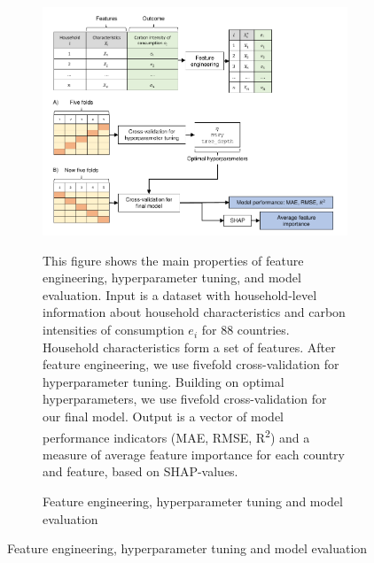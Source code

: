 \begin{figure}[ht!]\ContinuedFloat
   \begin{subfigure}[b]{\textwidth}
  \centering
  \includegraphics{1_Figures/Figures_Appendix/Graphical representation of data work_2.pdf}
  \caption{Feature engineering, hyperparameter tuning and model evaluation} \label{fig:data_visualisation_2}
  \begin{subcaption2}
    This figure shows the main properties of feature engineering, hyperparameter tuning, and model evaluation. Input is a dataset with household-level information about household characteristics and carbon intensities of consumption $e_{i}$ for 88 countries. Household characteristics form a set of features. After feature engineering, we use fivefold cross-validation for hyperparameter tuning. Building on optimal hyperparameters, we use fivefold cross-validation for our final model. Output is a vector of model performance indicators (MAE, RMSE, R\textsuperscript{2}) and a measure of average feature importance for each country and feature, based on SHAP-values.
  \end{subcaption2}
\end{subfigure}
\end{figure}

\clearpage

